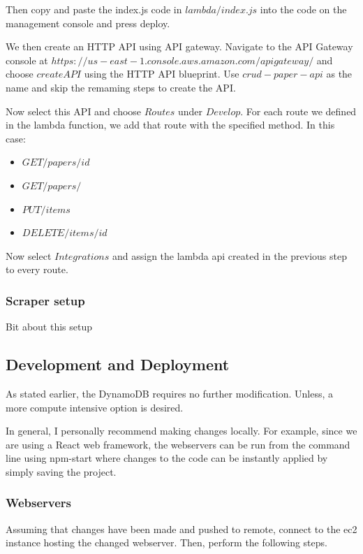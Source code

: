 \documentclass[12pt]{article}
\begin{document}
Then copy and paste the index.js code in $lambda/index.js$ into the code on the management console and press deploy.

We then create an HTTP API using API gateway. Navigate to the API Gateway console at $https://us-east-1.console.aws.amazon.com/apigateway/$ and choose $create API$ using the HTTP API blueprint. Use $crud-paper-api$ as the name and skip the remaming steps to create the API. 

Now select this API and choose $Routes$ under $Develop$. For each route we defined in the lambda function, we add that route with the specified method. In this case: 

\begin{itemize}
    \item $GET /papers/{id} $
    \item $GET /papers/$
    \item $PUT /items$
    \item $DELETE /items/{id}$
\end{itemize}

Now select $Integrations$ and assign the lambda api created in the previous step to every route.

\subsubsection{Scraper setup}

Bit about this setup

\subsection{Development and Deployment}

As stated earlier, the DynamoDB requires no further modification. Unless, a more compute intensive option is desired.

In general, I personally recommend making changes locally. For example, since we are using a React web framework, the webservers can be run from the command line using npm-start where changes to the code can be instantly applied by simply saving the project. 

\subsubsection{Webservers}

Assuming that changes have been made and pushed to remote, connect to the ec2 instance hosting the changed webserver. Then, perform the following steps.
\end{document}
